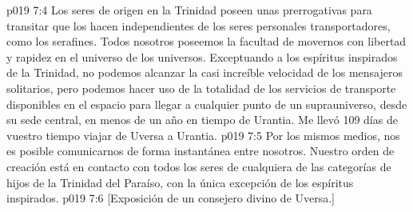 \vs p019 7:4 Los seres de origen en la Trinidad poseen unas prerrogativas para transitar que los hacen independientes de los seres personales transportadores, como los serafines. Todos nosotros poseemos la facultad de movernos con libertad y rapidez en el universo de los universos. Exceptuando a los espíritus inspirados de la Trinidad, no podemos alcanzar la casi increíble velocidad de los mensajeros solitarios, pero podemos hacer uso de la totalidad de los servicios de transporte disponibles en el espacio para llegar a cualquier punto de un suprauniverso, desde su sede central, en menos de un año en tiempo de Urantia. Me llevó 109 días de vuestro tiempo viajar de Uversa a Urantia.
\vs p019 7:5 Por los mismos medios, nos es posible comunicarnos de forma instantánea entre nosotros. Nuestro orden de creación está en contacto con todos los seres de cualquiera de las categorías de hijos de la Trinidad del Paraíso, con la única excepción de los espíritus inspirados.
\vsetoff
\vs p019 7:6 [Exposición de un consejero divino de Uversa.]
